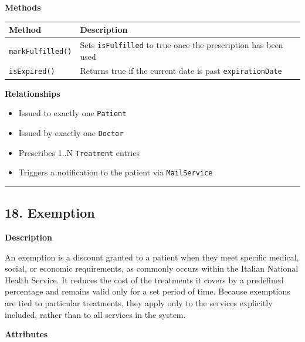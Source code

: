 \documentclass[12pt, a4paper]{article}
\begin{document}
\textbf{Methods}

\begin{center}
\small
\renewcommand{\arraystretch}{1.35}
\begin{tabularx}{\textwidth}{|M|Y|}
\hline
{}
\textbf{Method} & \textbf{Description} \\ \hline
\texttt{markFulfilled()} & Sets \texttt{isFulfilled} to true once the prescription has been used \\ \hline
\texttt{isExpired()} & Returns true if the current date is past \texttt{expirationDate} \\ \hline
\end{tabularx}
\end{center}

\textbf{Relationships}

\begin{itemize}
    \item Issued to exactly one \texttt{Patient}
    \item Issued by exactly one \texttt{Doctor}
    \item Prescribes 1..N \texttt{Treatment} entries
    \item Triggers a notification to the patient via \texttt{MailService}
\end{itemize}

\par\medskip\hrule\medskip

\subsection{18. Exemption}\label{sec:18-exemption}

\textbf{Description}

An exemption is a discount granted to a patient when they meet specific medical, social, or economic requirements, as commonly occurs within the Italian National Health Service. It reduces the cost of the treatments it covers by a predefined percentage and remains valid only for a set period of time. Because exemptions are tied to particular treatments, they apply only to the services explicitly included, rather than to all services in the system.

\textbf{Attributes}
\end{document}
